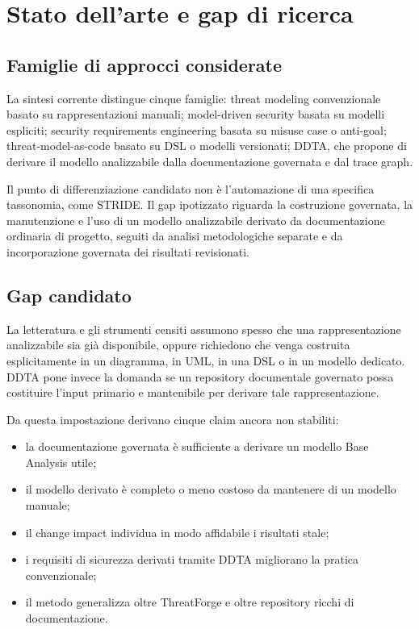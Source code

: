 \documentclass[12pt,a4paper,oneside]{report}
\begin{document}
\chapter{Stato dell'arte e gap di ricerca}

\section{Famiglie di approcci considerate}

La sintesi corrente distingue cinque famiglie: threat modeling convenzionale basato su rappresentazioni manuali; model-driven security basata su modelli espliciti; security requirements engineering basata su misuse case o anti-goal; threat-model-as-code basato su DSL o modelli versionati; DDTA, che propone di derivare il modello analizzabile dalla documentazione governata e dal trace graph.

Il punto di differenziazione candidato non è l'automazione di una specifica tassonomia, come STRIDE. Il gap ipotizzato riguarda la costruzione governata, la manutenzione e l'uso di un modello analizzabile derivato da documentazione ordinaria di progetto, seguiti da analisi metodologiche separate e da incorporazione governata dei risultati revisionati.

\section{Gap candidato}

La letteratura e gli strumenti censiti assumono spesso che una rappresentazione analizzabile sia già disponibile, oppure richiedono che venga costruita esplicitamente in un diagramma, in UML, in una DSL o in un modello dedicato. DDTA pone invece la domanda se un repository documentale governato possa costituire l'input primario e mantenibile per derivare tale rappresentazione.

Da questa impostazione derivano cinque claim ancora non stabiliti:

\begin{itemize}
  \item la documentazione governata è sufficiente a derivare un modello Base Analysis utile;
  \item il modello derivato è completo o meno costoso da mantenere di un modello manuale;
  \item il change impact individua in modo affidabile i risultati stale;
  \item i requisiti di sicurezza derivati tramite DDTA migliorano la pratica convenzionale;
  \item il metodo generalizza oltre ThreatForge e oltre repository ricchi di documentazione.
\end{itemize}
\end{document}
